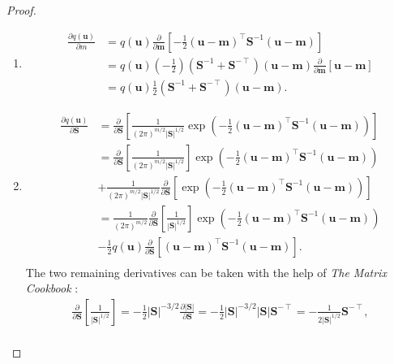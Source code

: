 \documentclass{article}
\theoremstyle{definition}
\theoremstyle{remark}
\newcommand{\dm}{\frac{\partial}{\partial\mathbf{m}}}
\newcommand{\dS}{\frac{\partial}{\partial\mathbf{S}}}
\begin{document}
\begin{proof}
  \leavevmode
  \begin{enumerate}
  \item
    \[
      \begin{split}
        \frac{\partial q(\mathbf{u})}{\partial m} &=
        q(\mathbf{u})\dm\left[-\frac{1}{2}(\mathbf{u} -
          \mathbf{m})^\intercal\mathbf{S}^{-1}(\mathbf{u} - \mathbf{m})\right]
        \\
        &= q(\mathbf{u})\left(-\frac{1}{2}\right)(\mathbf{S}^{-1} +
        \mathbf{S}^{-\intercal})(\mathbf{u} - \mathbf{m})\dm[\mathbf{u} -
        \mathbf{m}] \\
        &= q(\mathbf{u})\frac{1}{2}(\mathbf{S}^{-1} +
        \mathbf{S}^{-\intercal})(\mathbf{u} - \mathbf{m}).
      \end{split}
    \]
  \item
    \[
      \begin{split}
        \frac{\partial q(\mathbf{u})}{\partial \mathbf{S}} &=
        \dS\left[\frac{1}{(2\pi)^{m/2}|\mathbf{S}|^{1/2}}\exp \left( -\frac{1}{2}
            (\mathbf{u} - \mathbf{m})^\intercal\mathbf{S}^{-1}(\mathbf{u} -
            \mathbf{m})\right)\right] \\
        &= \dS\left[\frac{1}{(2\pi)^{m/2}|\mathbf{S}|^{1/2}}\right]\exp \left( -\frac{1}{2}
          (\mathbf{u} - \mathbf{m})^\intercal\mathbf{S}^{-1}(\mathbf{u} -
          \mathbf{m})\right) \\
        &+ \frac{1}{(2\pi)^{m/2}|\mathbf{S}|^{1/2}}\dS\left[\exp\left( -\frac{1}{2}
            (\mathbf{u} - \mathbf{m})^\intercal\mathbf{S}^{-1}(\mathbf{u} -
            \mathbf{m})\right)\right] \\
        &=
        \frac{1}{(2\pi)^{m/2}}\dS\left[\frac{1}{|\mathbf{S}|^{1/2}}\right]\exp
        \left( -\frac{1}{2} (\mathbf{u} -
          \mathbf{m})^\intercal\mathbf{S}^{-1}(\mathbf{u} - \mathbf{m})\right) \\
        &- \frac{1}{2}q(\mathbf{u})\dS[(\mathbf{u}
        - \mathbf{m})^\intercal\mathbf{S}^{-1}(\mathbf{u} - \mathbf{m})]. \\
      \end{split}
    \]
    The two remaining derivatives can be taken with the help of \emph{The Matrix
      Cookbook} \cite{petersen2008matrix}:
    \begin{gather*}
      \dS\left[\frac{1}{|\mathbf{S}|^{1/2}}\right] =
      -\frac{1}{2}|\mathbf{S}|^{-3/2}\frac{\partial |\mathbf{S}|}{\partial \mathbf{S}} =
      -\frac{1}{2}|\mathbf{S}|^{-3/2}|\mathbf{S}|\mathbf{S}^{-\intercal} = -\frac{1}{2|\mathbf{S}|^{1/2}}\mathbf{S}^{-\intercal}, \\

\end{gather*}
\end{enumerate}
\end{proof}
\end{document}
